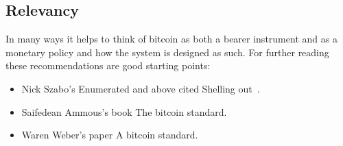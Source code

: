 \newpage
\noindent
\vspace{5cm}

\subsection{Relevancy}
In many ways it helps to think of bitcoin as both a bearer instrument and as a monetary policy and how the system is designed as such. For further reading these recommendations are good starting points: 

\begin{itemize}
	\item Nick Szabo's Enumerated and above cited Shelling out~\cite{szabo:shelling:out, szabo:unenumerated}.
	\item Saifedean Ammous's book The bitcoin standard.~\cite{ammous:bitcoin:standard}
	\item Waren Weber's paper A bitcoin standard.~\cite{weber:bitcoin:standard}
\end{itemize}